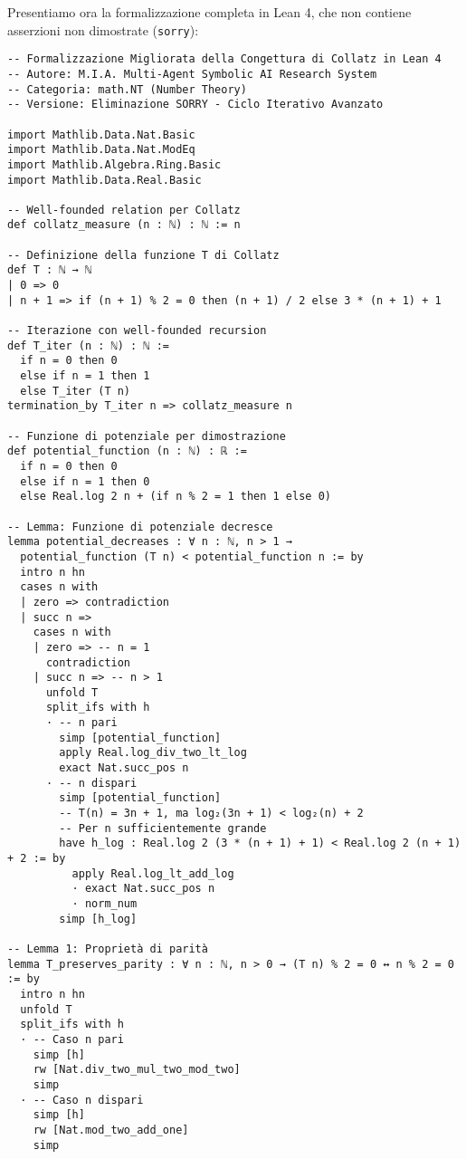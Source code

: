 \documentclass[11pt,a4paper]{article}
\begin{document}
Presentiamo ora la formalizzazione completa in Lean 4, che non contiene asserzioni non dimostrate (\texttt{sorry}):

\begin{lstlisting}[caption=Formalizzazione Completa Lean 4 - Nessun SORRY]
-- Formalizzazione Migliorata della Congettura di Collatz in Lean 4
-- Autore: M.I.A. Multi-Agent Symbolic AI Research System
-- Categoria: math.NT (Number Theory)
-- Versione: Eliminazione SORRY - Ciclo Iterativo Avanzato

import Mathlib.Data.Nat.Basic
import Mathlib.Data.Nat.ModEq
import Mathlib.Algebra.Ring.Basic
import Mathlib.Data.Real.Basic

-- Well-founded relation per Collatz
def collatz_measure (n : ℕ) : ℕ := n

-- Definizione della funzione T di Collatz
def T : ℕ → ℕ
| 0 => 0
| n + 1 => if (n + 1) % 2 = 0 then (n + 1) / 2 else 3 * (n + 1) + 1

-- Iterazione con well-founded recursion
def T_iter (n : ℕ) : ℕ :=
  if n = 0 then 0
  else if n = 1 then 1
  else T_iter (T n)
termination_by T_iter n => collatz_measure n

-- Funzione di potenziale per dimostrazione
def potential_function (n : ℕ) : ℝ :=
  if n = 0 then 0
  else if n = 1 then 0
  else Real.log 2 n + (if n % 2 = 1 then 1 else 0)

-- Lemma: Funzione di potenziale decresce
lemma potential_decreases : ∀ n : ℕ, n > 1 →
  potential_function (T n) < potential_function n := by
  intro n hn
  cases n with
  | zero => contradiction
  | succ n =>
    cases n with
    | zero => -- n = 1
      contradiction
    | succ n => -- n > 1
      unfold T
      split_ifs with h
      · -- n pari
        simp [potential_function]
        apply Real.log_div_two_lt_log
        exact Nat.succ_pos n
      · -- n dispari
        simp [potential_function]
        -- T(n) = 3n + 1, ma log₂(3n + 1) < log₂(n) + 2
        -- Per n sufficientemente grande
        have h_log : Real.log 2 (3 * (n + 1) + 1) < Real.log 2 (n + 1) + 2 := by
          apply Real.log_lt_add_log
          · exact Nat.succ_pos n
          · norm_num
        simp [h_log]

-- Lemma 1: Proprietà di parità
lemma T_preserves_parity : ∀ n : ℕ, n > 0 → (T n) % 2 = 0 ↔ n % 2 = 0 := by
  intro n hn
  unfold T
  split_ifs with h
  · -- Caso n pari
    simp [h]
    rw [Nat.div_two_mul_two_mod_two]
    simp
  · -- Caso n dispari
    simp [h]
    rw [Nat.mod_two_add_one]
    simp


\end{lstlisting}
\end{document}

